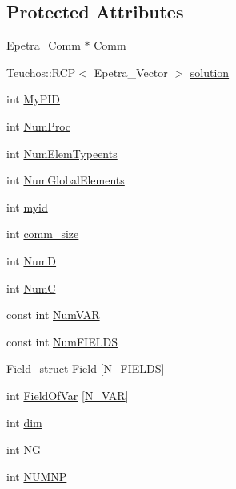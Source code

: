 \subsection*{Protected Attributes}
\begin{DoxyCompactItemize}
\item 
Epetra\+\_\+\+Comm $\ast$ \hyperlink{classGeProb_a28a1d41fc8c294fe629b95901df8f4e3}{Comm}
\item 
Teuchos\+::\+R\+CP$<$ Epetra\+\_\+\+Vector $>$ \hyperlink{classGeProb_af084ddda2d2d48a332141881d7b22a7d}{solution}
\item 
int \hyperlink{classGeProb_a646b814acd21db4a20bbbd9fe159da3f}{My\+P\+ID}
\item 
int \hyperlink{classGeProb_a8678d8a8dc17175ba98761beeccc0e04}{Num\+Proc}
\item 
int \hyperlink{classGeProb_a1555edf9114f6b65ef9a7820dfc16e63}{Num\+Elem\+Typeents}
\item 
int \hyperlink{classGeProb_af87232ea7d32eff7618f97a9792b3761}{Num\+Global\+Elements}
\item 
int \hyperlink{classGeProb_a45014741c0457991fb88b1dc1d2d31bc}{myid}
\item 
int \hyperlink{classGeProb_ab5aa970c9864597a442bfc8519352730}{comm\+\_\+size}
\item 
int \hyperlink{classGeProb_a1b63e3bc1b1f5e6582a87b044bbd4ccd}{NumD}
\item 
int \hyperlink{classGeProb_a579ca91b970ea46b1418310eaf5d8b31}{NumC}
\item 
const int \hyperlink{classGeProb_ac6d9c06150838e892ed3eaa1b60bac5d}{Num\+V\+AR}
\item 
const int \hyperlink{classGeProb_adede55ee31a140d1cd8a9076ecdc41e1}{Num\+F\+I\+E\+L\+DS}
\item 
\hyperlink{structField__struct}{Field\+\_\+struct} \hyperlink{classGeProb_aaaeb3e022301e2df5e180af7900a352e}{Field} \mbox{[}N\+\_\+\+F\+I\+E\+L\+DS\mbox{]}
\item 
int \hyperlink{classGeProb_a520a47a06c38cfe59938d2bbd65773a2}{Field\+Of\+Var} \mbox{[}\hyperlink{classED__Prob_a4e7d2ff1a8e435e336fb00c527224b5a}{N\+\_\+\+V\+AR}\mbox{]}
\item 
int \hyperlink{classGeProb_a122f6dbb7e9a60a35f257ae369a57f77}{dim}
\item 
int \hyperlink{classGeProb_ac9a59a8c31ccad50b7eabc436c365391}{NG}
\item 
int \hyperlink{classGeProb_adf7ed4cdeae11b7e6f15acc0ca7c1d21}{N\+U\+M\+NP}
\item 

\end{DoxyCompactItemize}
